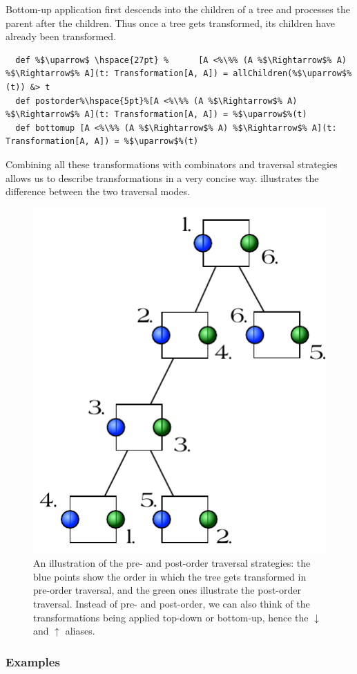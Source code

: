 \vspace{7pt} Bottom-up application first descends into the children of a tree and processes the parent after the children. Thus once a tree gets transformed, its children have already been transformed.

\begin{lstlisting}
  def %$\uparrow$ \hspace{27pt} %      [A <%\%% (A %$\Rightarrow$% A) %$\Rightarrow$% A](t: Transformation[A, A]) = allChildren(%$\uparrow$%(t)) &> t
  def postorder%\hspace{5pt}%[A <%\%% (A %$\Rightarrow$% A) %$\Rightarrow$% A](t: Transformation[A, A]) = %$\uparrow$%(t)
  def bottomup [A <%\%% (A %$\Rightarrow$% A) %$\Rightarrow$% A](t: Transformation[A, A]) = %$\uparrow$%(t)
\end{lstlisting}

Combining all these transformations with combinators and traversal strategies allows us to describe transformations in a very concise way.  illustrates the difference between the two traversal modes.

\begin{figure}
 \centering
 \includegraphics[width=0.4\linewidth]{traversal_mode.pdf}
 \caption{An illustration of the pre- and post-order traversal strategies: the blue points show the order in which the tree gets transformed in pre-order traversal, and the green ones illustrate the post-order traversal. Instead of pre- and post-order, we can also think of the transformations being applied top-down or bottom-up, hence the $\downarrow$ and $\uparrow$ aliases.}
 \label{figure:traversal_mode}
\end{figure}

\subsubsection{Examples}

